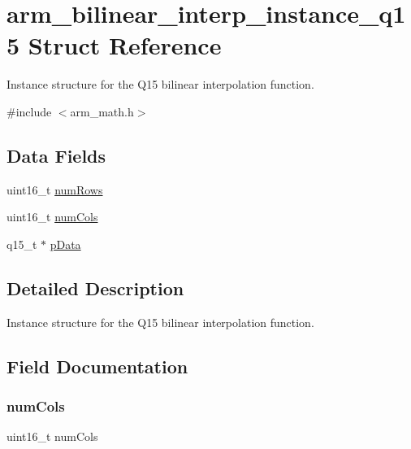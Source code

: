 \hypertarget{structarm__bilinear__interp__instance__q15}{}\section{arm\+\_\+bilinear\+\_\+interp\+\_\+instance\+\_\+q15 Struct Reference}
\label{structarm__bilinear__interp__instance__q15}


Instance structure for the Q15 bilinear interpolation function.  




{\ttfamily \#include $<$arm\+\_\+math.\+h$>$}

\subsection*{Data Fields}
\begin{DoxyCompactItemize}
\item 
uint16\+\_\+t \hyperlink{structarm__bilinear__interp__instance__q15_a1bcf80ccdc2acc29198f1592ae300390}{num\+Rows}
\item 
uint16\+\_\+t \hyperlink{structarm__bilinear__interp__instance__q15_a4bb5ec0d13eb4c9cf887aa8366a44117}{num\+Cols}
\item 
q15\+\_\+t $\ast$ \hyperlink{structarm__bilinear__interp__instance__q15_a817ede38365e63e561a12069c6c5c087}{p\+Data}
\end{DoxyCompactItemize}


\subsection{Detailed Description}
Instance structure for the Q15 bilinear interpolation function. 

\subsection{Field Documentation}
\mbox{\label{structarm__bilinear__interp__instance__q15_a4bb5ec0d13eb4c9cf887aa8366a44117}} 
\subsubsection{\texorpdfstring{num\+Cols}{numCols}}
{\footnotesize\ttfamily uint16\+\_\+t num\+Cols}

